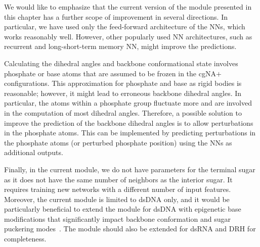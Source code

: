We would like to emphasize that the current version of the module presented in this chapter has a further scope of improvement in several directions.
In particular, we have used only the feed-forward architecture of the NNs, which works reasonably well. 
However, other popularly used NN architectures, such as recurrent and long-short-term memory NN, might improve the predictions.

Calculating the dihedral angles and backbone conformational state involves phosphate or base atoms that are assumed to be frozen in the cgNA$+$ configurations.
This approximation for phosphate and base as rigid bodies is reasonable; however, it might lead to erroneous backbone dihedral angles.
In particular, the atoms within a phosphate group fluctuate more and are involved in the computation of most dihedral angles.
Therefore, a possible solution to improve the prediction of the backbone dihedral angles is to allow perturbations in the phosphate atoms.
This can be implemented by predicting perturbations in the phosphate atoms (or perturbed phosphate position) using the NNs as additional outputs.

Finally, in the current module, we do not have parameters for the terminal sugar as it does not have the same number of neighbors as the interior sugar.
It requires training new networks with a different number of input features.
Moreover, the current module is limited to dsDNA only, and it would be particularly beneficial to extend the module for dsDNA with epigenetic base modifications that significantly impact backbone conformation and sugar puckering modes~\cite{banyay2002structural,liebl2019methyl}.
The module should also be extended for dsRNA and DRH for completeness.